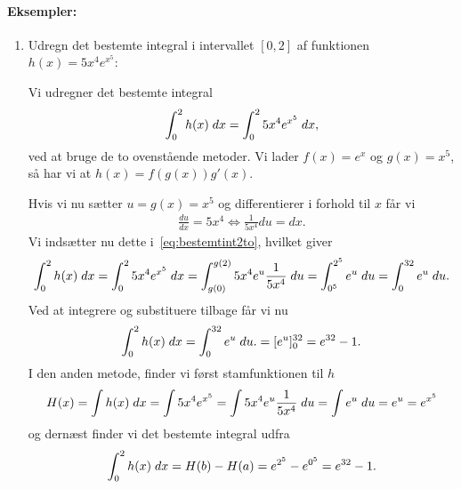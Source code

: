 \paragraph*{Eksempler:}
\begin{enumerate}
\item Udregn det bestemte integral i intervallet $[0,2]$ af funktionen $h(x)=5x^4e^{x^5}$:

Vi udregner det bestemte integral
\begin{align}\label{eq:bestemtint2to}
\int_0^2 h(x) \; d x = \int_0^2 5x^4e^{x^5} \; d x,
\end{align}
ved at bruge de to ovenstående metoder. Vi lader $f(x)=e^x$ og $g(x)=x^5$, så har vi at $h(x)=f(g(x))g'(x)$.

Hvis vi nu sætter $u=g(x)=x^5$ og differentierer i forhold til $x$ får vi
\begin{align*}
\frac{du}{dx}=5x^4 \Leftrightarrow \frac{1}{5x^4} d u = dx.
\end{align*}
Vi indsætter nu dette i~\eqref{eq:bestemtint2to}, hvilket giver
\begin{align*}
\int_0^2 h(x) \; d x = \int_0^2 5x^4e^{x^5} \; d x = \int_{g(0)}^{g(2)} 5x^4 e^u \frac{1}{5x^4} \; d u = \int_{0^5}^{2^5} e^u \; d u = \int_0^{32} e^u \; d u.
\end{align*}
Ved at integrere og substituere tilbage får vi nu
\begin{align*}
\int_0^2 h(x) \; d x = \int_0^{32} e^u \; d u. = [e^u]_0^{32} = e^{32}-1.
\end{align*}
I den anden metode, finder vi først stamfunktionen til $h$
\begin{align*}
H(x)=\int h(x) \; d x = \int 5 x^4e^{x^5} = \int 5x^4 e^u \frac{1}{5x^4} \; d u = \int e^u \; d u = e^u = e^{x^5}
\end{align*}
og dernæst finder vi det bestemte integral udfra
\begin{align*}
\int_0^2 h(x) \; d x = H(b) - H(a) = e^{2^5}-e^{0^5} = e^{32} - 1.
\end{align*}
\end{enumerate}










